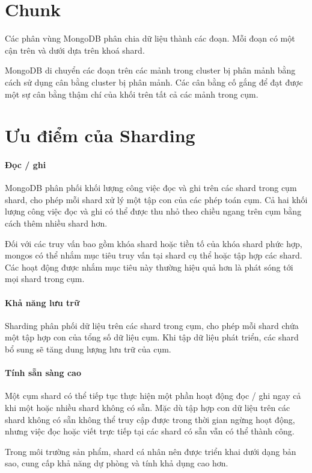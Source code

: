 \section{Chunk}
Các phân vùng MongoDB phân chia dữ liệu thành các đoạn. Mỗi đoạn có một cận trên và dưới dựa trên khoá shard.

MongoDB di chuyển các đoạn trên các mảnh trong cluster bị phân mảnh bằng cách sử dụng cân bằng cluster bị phân mảnh. Các cân bằng cố gắng để đạt được một sự cân bằng thậm chí của khối trên tất cả các mảnh trong cụm.

\section{Ưu điểm của Sharding}
\paragraph{Đọc / ghi}
MongoDB phân phối khối lượng công việc đọc và ghi trên các shard trong cụm shard, cho phép mỗi shard xử lý một tập con của các phép toán cụm. Cả hai khối lượng công việc đọc và ghi có thể được thu nhỏ theo chiều ngang trên cụm bằng cách thêm nhiều shard hơn.

Đối với các truy vấn bao gồm khóa shard hoặc tiền tố của khóa shard phức hợp, mongos có thể nhắm mục tiêu truy vấn tại shard cụ thể hoặc tập hợp các shard. Các hoạt động được nhắm mục tiêu này thường hiệu quả hơn là phát sóng tới mọi shard trong cụm.

\paragraph{Khả năng lưu trữ}
Sharding phân phối dữ liệu trên các shard trong cụm, cho phép mỗi shard chứa một tập hợp con của tổng số dữ liệu cụm. Khi tập dữ liệu phát triển, các shard bổ sung sẽ tăng dung lượng lưu trữ của cụm.

\paragraph{Tính sẵn sàng cao}
Một cụm shard có thể tiếp tục thực hiện một phần hoạt động đọc / ghi ngay cả khi một hoặc nhiều shard không có sẵn. Mặc dù tập hợp con dữ liệu trên các shard không có sẵn không thể truy cập được trong thời gian ngừng hoạt động, nhưng việc đọc hoặc viết trực tiếp tại các shard có sẵn vẫn có thể thành công.

Trong môi trường sản phẩm, shard cá nhân nên được triển khai dưới dạng bản sao, cung cấp khả năng dự phòng và tính khả dụng cao hơn.

